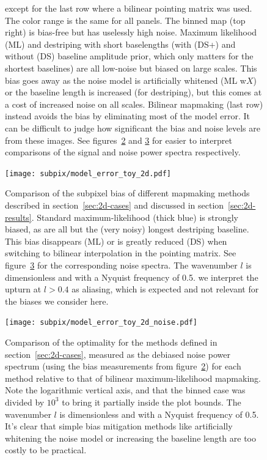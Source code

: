 \documentclass[twocolumn,apj]{aastex63}
\begin{document}
\begin{figure}[p]
{		except for the last row where a bilinear pointing matrix was used.
		The color range is the same for all panels.
		The binned map (top right) is bias-free but has uselessly high noise. Maximum likelihood (ML)
		and destriping with short baselengths (with (DS+) and without (DS) baseline amplitude prior,
		which only matters for the shortest baselines)
		are all low-noise but biased on large scales. This bias goes away as the noise model
		is artificially whitened (ML w$X$) or the baseline length is increased (for destriping),
		but this comes at a cost of increased noise on all scales.
		Bilinear mapmaking (last row) instead avoids the bias by eliminating most of the model error.
		It can be difficult to judge how significant the bias and noise levels are from
		these images. See figures~\ref{fig:2d-bias} and \ref{fig:2d-noise} for easier to
		interpret comparisons of the signal and noise power spectra respectively.
	}
	\label{fig:2d-maps}
\end{figure}

\begin{figure}
	\centering
	\hspace*{-5mm}\texttt{[image: subpix/model\_error\_toy\_2d.pdf]}
	\caption{
		Comparison of the subpixel bias of different mapmaking methods
		described in section~\ref{sec:2d-cases} and discussed in section~\ref{sec:2d-results}.
		Standard maximum-likelihood (thick blue) is strongly biased, as are all but
		the (very noisy) longest destriping baseline. This bias disappears (ML)
		or is greatly reduced (DS) when switching to bilinear interpolation in the pointing matrix.
		See figure~\ref{fig:2d-noise} for the corresponding noise spectra.
		The wavenumber $l$ is dimensionless and with a Nyquist frequency of 0.5.
		we interpret the upturn at $l>0.4$ as aliasing, which
		is expected and not relevant for the biases we consider here.
	}
	\label{fig:2d-bias}
\end{figure}

\begin{figure}[h!]
	\centering
	\hspace*{-5mm}\texttt{[image: subpix/model\_error\_toy\_2d\_noise.pdf]}
	\caption{
		Comparison of the optimality for the methods defined in section~\ref{sec:2d-cases}, measured
		as the debiased noise power spectrum (using the bias measurements from figure~\ref{fig:2d-bias})
		for each method relative to that of bilinear maximum-likelihood mapmaking.
		Note the logarithmic vertical axis, and that the binned case was divided by $10^3$
		to bring it partially inside the plot bounds.
		The wavenumber $l$ is dimensionless and with a Nyquist frequency of 0.5.
		It's clear that simple bias mitigation
		methods like artificially whitening the noise model or increasing the
		baseline length are too costly to be practical.
	}
	\label{fig:2d-noise}
\end{figure}
\end{document}
